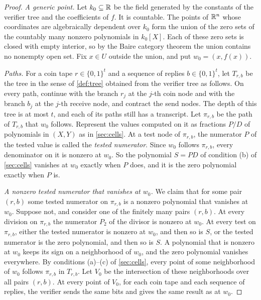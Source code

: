 \begin{proof}
\emph{A generic point.}
Let $k_0\subseteq\mathbb{R}$ be the field generated by the constants of the verifier tree and the coefficients of $f$.
It is countable.
The points of $\mathbb{R}^n$ whose coordinates are algebraically dependent over $k_0$ form the union of the zero sets of the countably many nonzero polynomials in $k_0[X]$.
Each of these zero sets is closed with empty interior, so by the Baire category theorem the union contains no nonempty open set.
Fix $x\in U$ outside the union, and put $w_0=(x,f(x))$.

\emph{Paths.}
For a coin tape $r\in\{0,1\}^t$ and a sequence of replies $b\in\{0,1\}^t$, let $T_{r,b}$ be the tree in the sense of \cref{def:tree} obtained from the verifier tree as follows.
On every path, continue with the branch $r_j$ at the $j$-th coin node and with the branch $b_j$ at the $j$-th receive node, and contract the send nodes.
The depth of this tree is at most $t$, and each of its paths still has a transcript.
Let $\pi_{r,b}$ be the path of $T_{r,b}$ that $w_0$ follows.
Represent the values computed on it as fractions $P/D$ of polynomials in $(X,Y)$ as in \cref{sec:cells}.
At a test node of $\pi_{r,b}$, the numerator $P$ of the tested value is called the \emph{tested numerator}.
Since $w_0$ follows $\pi_{r,b}$, every denominator on it is nonzero at $w_0$.
So the polynomial $S=PD$ of condition \textup{(b)} of \cref{sec:cells} vanishes at $w_0$ exactly when $P$ does, and it is the zero polynomial exactly when $P$ is.

\emph{A nonzero tested numerator that vanishes at $w_0$.}
We claim that for some pair $(r,b)$ some tested numerator on $\pi_{r,b}$ is a nonzero polynomial that vanishes at $w_0$.
Suppose not, and consider one of the finitely many pairs $(r,b)$.
At every division on $\pi_{r,b}$ the numerator $P_2$ of the divisor is nonzero at $w_0$.
At every test on $\pi_{r,b}$, either the tested numerator is nonzero at $w_0$, and then so is $S$, or the tested numerator is the zero polynomial, and then so is $S$.
A polynomial that is nonzero at $w_0$ keeps its sign on a neighborhood of $w_0$, and the zero polynomial vanishes everywhere.
By conditions \textup{(a)}--\textup{(c)} of \cref{sec:cells}, every point of some neighborhood of $w_0$ follows $\pi_{r,b}$ in $T_{r,b}$.
Let $V_0$ be the intersection of these neighborhoods over all pairs $(r,b)$.
At every point of $V_0$, for each coin tape and each sequence of replies, the verifier sends the same bits and gives the same result as at $w_0$.


\end{proof}
